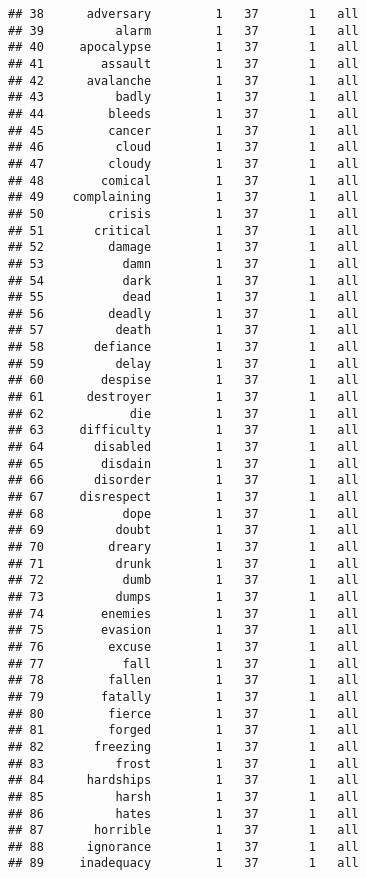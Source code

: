 \documentclass[
]{article}
\begin{document}
\begin{verbatim}
## 38      adversary         1   37       1   all
## 39          alarm         1   37       1   all
## 40     apocalypse         1   37       1   all
## 41        assault         1   37       1   all
## 42      avalanche         1   37       1   all
## 43          badly         1   37       1   all
## 44         bleeds         1   37       1   all
## 45         cancer         1   37       1   all
## 46          cloud         1   37       1   all
## 47         cloudy         1   37       1   all
## 48        comical         1   37       1   all
## 49    complaining         1   37       1   all
## 50         crisis         1   37       1   all
## 51       critical         1   37       1   all
## 52         damage         1   37       1   all
## 53           damn         1   37       1   all
## 54           dark         1   37       1   all
## 55           dead         1   37       1   all
## 56         deadly         1   37       1   all
## 57          death         1   37       1   all
## 58       defiance         1   37       1   all
## 59          delay         1   37       1   all
## 60        despise         1   37       1   all
## 61      destroyer         1   37       1   all
## 62            die         1   37       1   all
## 63     difficulty         1   37       1   all
## 64       disabled         1   37       1   all
## 65        disdain         1   37       1   all
## 66       disorder         1   37       1   all
## 67     disrespect         1   37       1   all
## 68           dope         1   37       1   all
## 69          doubt         1   37       1   all
## 70         dreary         1   37       1   all
## 71          drunk         1   37       1   all
## 72           dumb         1   37       1   all
## 73          dumps         1   37       1   all
## 74        enemies         1   37       1   all
## 75        evasion         1   37       1   all
## 76         excuse         1   37       1   all
## 77           fall         1   37       1   all
## 78         fallen         1   37       1   all
## 79        fatally         1   37       1   all
## 80         fierce         1   37       1   all
## 81         forged         1   37       1   all
## 82       freezing         1   37       1   all
## 83          frost         1   37       1   all
## 84      hardships         1   37       1   all
## 85          harsh         1   37       1   all
## 86          hates         1   37       1   all
## 87       horrible         1   37       1   all
## 88      ignorance         1   37       1   all
## 89     inadequacy         1   37       1   all

\end{verbatim}
\end{document}
